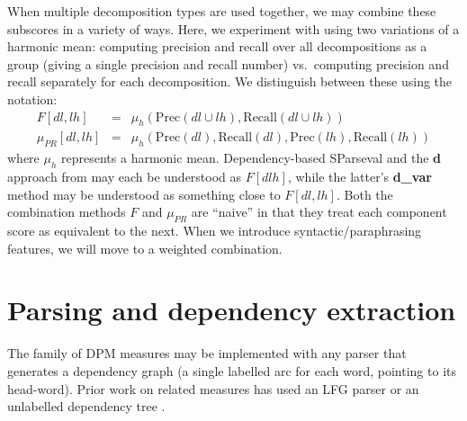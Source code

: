 \documentclass{kluwer}    %
\newcommand{\precision}[1]{\ensuremath{\textrm{Prec}\left(#1\right)}}
\newcommand{\recall}[1]{\ensuremath{\textrm{Recall}\left(#1\right)}}
\begin{document}
\begin{article}


When multiple decomposition types are used together, we may combine
these subscores in a variety of ways. Here, we experiment with using
two variations of a harmonic mean:
computing precision and recall over all
decompositions as a group (giving a single precision and recall number)
vs.\ computing precision and recall separately for each decomposition.
We distinguish between these using the notation:
\begin{eqnarray}
  \label{eq:fprmeans}
  F[dl,lh] & = &
  \mu_h \left( \precision{dl \cup lh},
    \recall{dl \cup lh} \right) \\
  \mu_{PR}[dl,lh]  & = & \mu_h \left( \precision{dl},
    \recall{dl}, \precision{lh}, \recall{lh} \right)    
\end{eqnarray}
where $\mu_h$ represents a harmonic mean.
Dependency-based SParseval  
and the \textbf{d} approach from
 may each be understood as
$F[dlh]$, while the latter's \textbf{d\_var} method may be understood
as something close to $F[dl,lh]$.
%
Both the combination methods $F$ and
$\mu_{PR}$ are ``naive'' in that they treat each component
score as equivalent to the next.  When we introduce syntactic/paraphrasing
features, we will move to a weighted combination.



\section{Parsing and dependency extraction}

The family of DPM measures may be implemented with
any parser that generates a dependency graph (a single labelled arc
for each word, pointing to its head-word). Prior work
\cite{owczarzak07evaluatingmt} on related
measures has used an LFG parser \cite{cahill04lfg} or
an unlabelled dependency tree \cite{liu05syntaxformteval}. 


\end{article}
\end{document}

